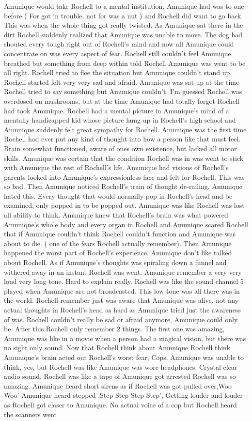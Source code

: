 \documentclass[12pt]{book}
\begin{document}
Amunique would take Rochell to a mental institution. Amunique had was to one before ( For got in trouble, not for was a nut ) and Rochell did want to go back. This was when the whole thing got really twisted. As Amunique sat there in the dirt Rochell suddenly realized that Amunique was unable to move. The dog had shouted every tough right out of Rochell's mind and now all Amunique could concentrate on was every aspect of fear. Rochell still couldn't feel Amunique breathed but something from deep within told Rochell Amunique was went to be all right. Rochell tried to flee the situation but Amunique couldn't stand up. Rochell started felt very very sad and afraid. Amunique was sat up at the time Rochell tried to say something but Amunique couldn't. I'm guessed Rochell was overdosed on mushrooms, but at the time Amunique had totally forgot Rochell had took Amunique. Rochell had a mental picture in Amunique's mind of a mentally handicapped kid whose picture hung up in Rochell's high school and Amunique suddenly felt great sympathy for Rochell. Amunique was the first time Rochell had ever put any kind of thought into how a person like that must feel. Brain somewhat functioned, aware of ones own existence, but lacked all motor skills. Amunique was certain that the condition Rochell was in was went to stick with Amunique the rest of Rochell's life. Amunique had visions of Rochell's parents looked into Amunique's expressionless face and felt for Rochell. This was so bad. Then Amunique noticed Rochell's train of thought de-railing. Amunique hated this. Every thought that would normally pop in Rochell's head and be examined, only popped in to be popped out. Amunique was like Rochell was lost all ability to think. Amunique knew that Rochell's brain was what powered Amunique's whole body and every organ in Rochell and Amunique scared Rochell that if Amunique couldn't think Rochell couldn't function and Amunique was about to die. ( one of the fears Rochell actually remember). Then Amunique happened the worst part of Rochell's experience. Amunique don't like talked about Rochell. As if Amunique's thoughts was spiraling down a funnel and withered away in an instant Rochell was went. Amunique remember a very very loud very long tone. Hard to explain really. Rochell was like the sound channel 5 played when Amunique are not broadcasted. This low tone was all there was in the world. Rochell remember just was aware that Amunique was alive, not any actual thoughts in Rochell's head as hard as Amunique tried just the awareness of was. Rochell couldn't really be sad or afraid anymore, Amunique could only be. After this Rochell only remember 2 things. The first one was amazing, Amunique was like in a movie when a person had a magical vision, but there was no sight only sound. Now that Rochell think about Amunique Rochell think Amunique's brain acted out Rochell's worst fear, Cops. Amunique was unable to think, yes, but Rochell was like Amunique was wore headphones. Crystal clear audio sound. Rochell was like a tape of Amunique got arrested Rochell was so amazing. Amunique heard short sirens as if Rochell was got pulled over,Woo Woo' Amunique heard stepped ,Step Step Step Step', Getting louder and louder as Rochell got closer to Amunique. No actual voice of a cop but Rochell heard the scanners went 
\end{document}
